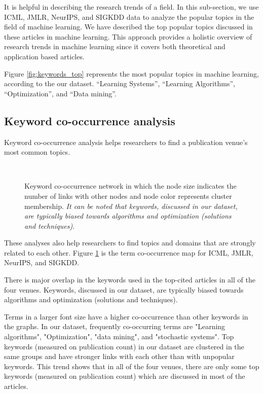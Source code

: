 It is helpful in describing the research trends of a field. In this sub-section, we use ICML, JMLR, NeurIPS, and SIGKDD data to analyze the popular topics in the field of machine learning. We have described the top popular topics discussed in these articles in machine learning. This approach provides a holistic overview of research trends in machine learning since it covers both theoretical and application based articles.

Figure \ref{fig:keywords_top} represents the most popular topics in machine learning, according to the our dataset. ``Learning Systems'', ``Learning Algorithms'', ``Optimization'', and ``Data mining''. 


\subsection{Keyword co-occurrence analysis}
Keyword co-occurrence analysis helps researchers to find a publication venue's most common topics. 
\begin{figure}[!htbp]
	\centering
	\\
	\caption{Keyword co-occurrence network in which the node size indicates the number of links with other nodes and node color represents cluster membership. \textit{It can be noted that keywords, discussed in our dataset, are typically biased towards algorithms and optimization (solutions and techniques)}.}
	\label{fig:keyword_top_gephi}
\end{figure}

These analyses also help researchers to find topics and domains that are strongly related to each other. Figure \ref{fig:keyword_top_gephi} is the term co-occurrence map for ICML, JMLR, NeurIPS, and SIGKDD.

There is major overlap in the keywords used in the top-cited articles in all of the four venues. Keywords, discussed in our dataset, are typically biased towards algorithms and optimization (solutions and techniques).

Terms in a larger font size have a higher co-occurrence than other keywords in the graphs. In our dataset, frequently co-occurring terms are "Learning algorithms", "Optimization", "data mining", and "stochastic systems". Top keywords (measured on publication count) in our dataset are clustered in the same groups and have stronger links with each other than with unpopular keywords. This trend shows that in all of the four venues, there are only some top keywords (measured on publication count) which are discussed in most of the articles.



